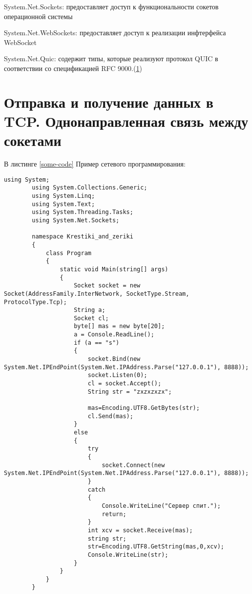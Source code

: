 \documentclass[a4paper, 12pt]{report}
\begin{document}
	System.Net.Sockets: предоставляет доступ к функциональности сокетов операционной системы
	
	System.Net.WebSockets: предоставляет доступ к реализации инфтерфейса WebSocket
	
	System.Net.Quic: содержит типы, которые реализуют протокол QUIC в соответствии со спецификацией RFC 9000.(\ref{})
	
	\chapter{Отправка и получение данных в TCP. Однонаправленная связь между сокетами}
	
	В листинге \ref{some-code} Пример сетевого программирования:
	
	\begin{lstlisting}[label=some-code,caption= Поиск основных состояний]
		using System;
		using System.Collections.Generic;
		using System.Linq;
		using System.Text;
		using System.Threading.Tasks;
		using System.Net.Sockets;
		
		namespace Krestiki_and_zeriki
		{
			class Program
			{
				static void Main(string[] args)
				{
					Socket socket = new Socket(AddressFamily.InterNetwork, SocketType.Stream, ProtocolType.Tcp);
					String a;
					Socket cl;
					byte[] mas = new byte[20];
					a = Console.ReadLine();
					if (a == "s")
					{
						socket.Bind(new System.Net.IPEndPoint(System.Net.IPAddress.Parse("127.0.0.1"), 8888));
						socket.Listen(0);
						cl = socket.Accept();
						String str = "zxzxzxzx";
						
						mas=Encoding.UTF8.GetBytes(str);
						cl.Send(mas);
					}
					else 
					{
						try
						{
							socket.Connect(new System.Net.IPEndPoint(System.Net.IPAddress.Parse("127.0.0.1"), 8888));
						}
						catch
						{
							Console.WriteLine("Сервер спит.");
							return;
						}
						int xcv = socket.Receive(mas);
						string str;
						str=Encoding.UTF8.GetString(mas,0,xcv);
						Console.WriteLine(str);
					}
				}
			}
		}
	\end{lstlisting}
	
	
	\printbibliography
	
\end{document}
